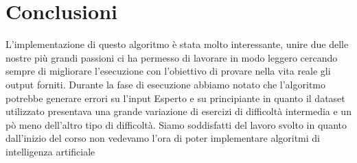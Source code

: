 \documentclass{book}
\begin{document}
\section{Conclusioni}
L'implementazione di questo algoritmo è stata molto interessante, unire due delle nostre più grandi passioni ci ha permesso di lavorare in modo leggero cercando sempre di migliorare l'esecuzione con l'obiettivo di provare nella vita reale gli output forniti. Durante la fase di esecuzione abbiamo notato che l'algoritmo potrebbe generare errori su l'input Esperto e su principiante in quanto il dataset utilizzato presentava una grande variazione di esercizi di difficoltà intermedia e un pò meno dell'altro tipo di difficoltà. Siamo soddisfatti del lavoro svolto in quanto dall'inizio del corso non vedevamo l'ora di poter implementare algoritmi di intelligenza artificiale
\end{document}
